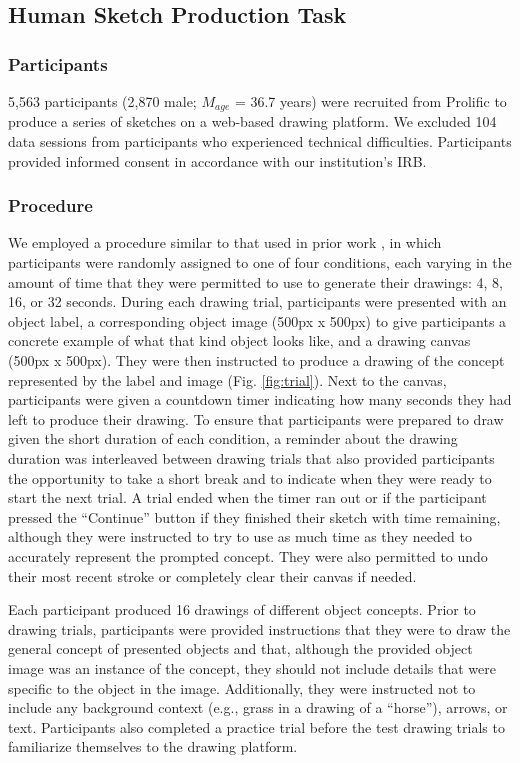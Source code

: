 \documentclass[10pt,letterpaper]{article}
\begin{document}
\subsection{Human Sketch Production Task} 
\subsubsection{Participants} 
5,563 participants (2,870 male; $M_{age}$ = 36.7 years) were recruited from Prolific to produce a series of sketches on a web-based drawing platform. 
We excluded 104 data sessions from participants who experienced technical difficulties.
Participants provided informed consent in accordance with our institution’s IRB.

\subsubsection{Procedure}
We employed a procedure similar to that used in prior work \cite{berger2013style}, in which participants were randomly assigned to one of four conditions, each varying in the amount of time that they were permitted to use to generate their drawings: 4, 8, 16, or 32 seconds. 
During each drawing trial, participants were presented with an object label, a corresponding object image (500px x 500px) to give participants a concrete example of what that kind object looks like, and a drawing canvas (500px x 500px). 
They were then instructed to produce a drawing of the concept represented by the label and image (Fig. \ref{fig:trial}). 
Next to the canvas, participants were given a countdown timer indicating how many seconds they had left to produce their drawing. 
To ensure that participants were prepared to draw given the short duration of each condition, a reminder about the drawing duration was interleaved between drawing trials that also provided participants the opportunity to take a short break and to indicate when they were ready to start the next trial. 
A trial ended when the timer ran out or if the participant pressed the ``Continue'' button if they finished their sketch with time remaining, although they were instructed to try to use as much time as they needed to accurately represent the prompted concept.
They were also permitted to undo their most recent stroke or completely clear their canvas if needed. 

Each participant produced 16 drawings of different object concepts.
Prior to drawing trials, participants were provided instructions that they were to draw the general concept of presented objects and that, although the provided object image was an instance of the concept, they should not include details that were specific to the object in the image. 
Additionally, they were instructed not to include any background context (e.g., grass in a drawing of a ``horse''), arrows, or text.
Participants also completed a practice trial before the test drawing trials to familiarize themselves to the drawing platform.
\end{document}
